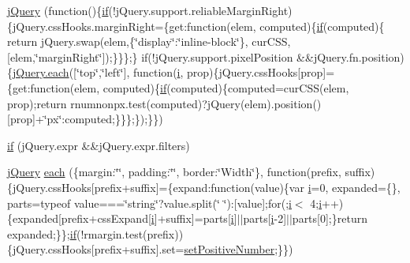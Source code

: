 \begin{DoxyCompactItemize}
\item 
\hyperlink{_scripts_2jquery-1_810_82_8js_a41c2e1bff4a6b292938143764e31d789}{j\+Query} (function()\{\hyperlink{_scripts_2respond_8min_8js_a93851d60dd037a83509a1757b9ee7b66}{if}(!j\+Query.\+support.\+reliable\+Margin\+Right)\{j\+Query.\+css\+Hooks.\+margin\+Right=\{get\+:function(elem, computed)\{\hyperlink{_scripts_2respond_8min_8js_a93851d60dd037a83509a1757b9ee7b66}{if}(computed)\{   return j\+Query.\+swap(elem,\{\char`\"{}display\char`\"{}\+:\char`\"{}inline-\/block\char`\"{}\}, cur\+C\+S\+S, \mbox{[}elem,\char`\"{}margin\+Right\char`\"{}\mbox{]});\}\}\};\}       if(!j\+Query.\+support.\+pixel\+Position \&\&j\+Query.\+fn.\+position)\{\hyperlink{_scripts_2jquery-1_810_82_8min_8js_af24c9ea1e34372f8c8b312b35586008d}{j\+Query.\+each}(\mbox{[}\char`\"{}top\char`\"{},\char`\"{}left\char`\"{}\mbox{]}, function(\hyperlink{_scripts_2respond_8min_8js_a5e25b1d1bed9ab5f3174b76d6a722180}{i}, prop)\{j\+Query.\+css\+Hooks\mbox{[}prop\mbox{]}=\{get\+:function(elem, computed)\{\hyperlink{_scripts_2respond_8min_8js_a93851d60dd037a83509a1757b9ee7b66}{if}(computed)\{computed=cur\+C\+S\+S(elem, prop);return rnumnonpx.\+test(computed)?j\+Query(elem).position()\mbox{[}prop\mbox{]}+\char`\"{}px\char`\"{}\+:computed;\}\}\};\});\}\})
\item 
\hyperlink{_scripts_2jquery-1_810_82_8js_a0335a19470806a284d8c38df8f5b5718}{if} (j\+Query.\+expr \&\&j\+Query.\+expr.\+filters)
\item 
\hyperlink{_scripts_2jquery-1_810_82_8js_a41c2e1bff4a6b292938143764e31d789}{j\+Query} \hyperlink{_scripts_2jquery-1_810_82_8js_a4d613a6d16c025ab901ff536b58f9ecd}{each} (\{margin\+:\char`\"{}\char`\"{}, padding\+:\char`\"{}\char`\"{}, border\+:\char`\"{}Width\char`\"{}\}, function(prefix, suffix)\{j\+Query.\+css\+Hooks\mbox{[}prefix+suffix\mbox{]}=\{expand\+:function(value)\{var \hyperlink{_scripts_2respond_8min_8js_a5e25b1d1bed9ab5f3174b76d6a722180}{i}=0, expanded=\{\}, parts=typeof value===\char`\"{}string\char`\"{}?value.\+split(\char`\"{} \char`\"{})\+:\mbox{[}value\mbox{]};for(;\hyperlink{_scripts_2respond_8min_8js_a5e25b1d1bed9ab5f3174b76d6a722180}{i}$<$ 4;\hyperlink{_scripts_2respond_8min_8js_a5e25b1d1bed9ab5f3174b76d6a722180}{i}++)\{expanded\mbox{[}prefix+css\+Expand\mbox{[}\hyperlink{_scripts_2respond_8min_8js_a5e25b1d1bed9ab5f3174b76d6a722180}{i}\mbox{]}+suffix\mbox{]}=parts\mbox{[}\hyperlink{_scripts_2respond_8min_8js_a5e25b1d1bed9ab5f3174b76d6a722180}{i}\mbox{]}$\vert$$\vert$parts\mbox{[}\hyperlink{_scripts_2respond_8min_8js_a5e25b1d1bed9ab5f3174b76d6a722180}{i}-\/2\mbox{]}$\vert$$\vert$parts\mbox{[}0\mbox{]};\}return expanded;\}\};\hyperlink{_scripts_2respond_8min_8js_a93851d60dd037a83509a1757b9ee7b66}{if}(!rmargin.\+test(prefix))\{j\+Query.\+css\+Hooks\mbox{[}prefix+suffix\mbox{]}.set=\hyperlink{_scripts_2jquery-1_810_82_8js_a049182834e8b4b2d7485cd919ed272d7}{set\+Positive\+Number};\}\})

\end{DoxyCompactItemize}

